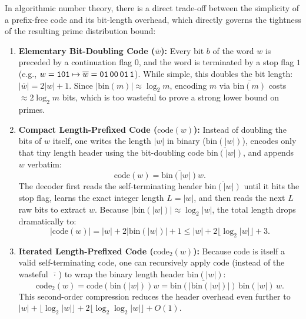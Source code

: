 \documentclass[acmsmall,natbib=false,nonacm]{acmart}
\begin{document}
In algorithmic number theory, there is a direct trade-off between the simplicity of a prefix-free code and its bit-length overhead, which directly governs the tightness of the resulting prime distribution bound:
\begin{enumerate}
    \item \textbf{Elementary Bit-Doubling Code ($\overline{w}$):} Every bit $b$ of the word $w$ is preceded by a continuation flag $0$, and the word is terminated by a stop flag $1$ (e.g., $w = \texttt{101} \mapsto \overline{w} = \texttt{01\,00\,01\,1}$). While simple, this doubles the bit length: $|\overline{w}| = 2|w| + 1$. Since $|\text{bin}(m)| \approx \log_2 m$, encoding $m$ via $\overline{\text{bin}(m)}$ costs $\approx 2\log_2 m$ bits, which is too wasteful to prove a strong lower bound on primes.
    \item \textbf{Compact Length-Prefixed Code ($\text{code}(w)$):} Instead of doubling the bits of $w$ itself, one writes the length $|w|$ in binary ($\text{bin}(|w|)$), encodes only that tiny length header using the bit-doubling code $\overline{\text{bin}(|w|)}$, and appends $w$ verbatim:
    \begin{equation}
        \text{code}(w) = \overline{\text{bin}(|w|)}w.
    \end{equation}
    The decoder first reads the self-terminating header $\overline{\text{bin}(|w|)}$ until it hits the stop flag, learns the exact integer length $L = |w|$, and then reads the next $L$ raw bits to extract $w$. Because $|\text{bin}(|w|)| \approx \log_2 |w|$, the total length drops dramatically to:
    \begin{equation}
        |\text{code}(w)| = |w| + 2|\text{bin}(|w|)| + 1 \le |w| + 2\lfloor\log_2 |w|\rfloor + 3.
    \end{equation}
    \item \textbf{Iterated Length-Prefixed Code ($\text{code}_2(w)$):} Because $\text{code}$ is itself a valid self-terminating code, one can recursively apply $\text{code}$ (instead of the wasteful $\overline{\,\cdot\,}$) to wrap the binary length header $\text{bin}(|w|)$:
    \begin{equation}
        \text{code}_2(w) = \text{code}(\text{bin}(|w|))w = \overline{\text{bin}(|\text{bin}(|w|)|)}\,\text{bin}(|w|)\,w.
    \end{equation}
    This second-order compression reduces the header overhead even further to $|w| + \lfloor\log_2 |w|\rfloor + 2\lfloor\log_2 \log_2 |w|\rfloor + O(1)$.
\end{enumerate}
\end{document}

